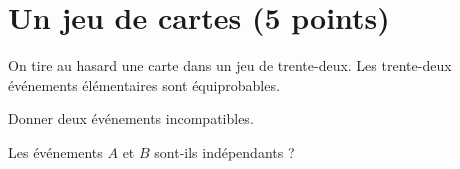 \section{Un jeu de cartes (5 points)}

On tire au hasard une carte dans un jeu de trente-deux. Les trente-deux événements élémentaires sont équiprobables.

\begin{questions}
	\question[1] Donner deux événements incompatibles.
	
	\question Les événements $A$ et $B$ sont-ils indépendants ?
	
\end{questions} 

